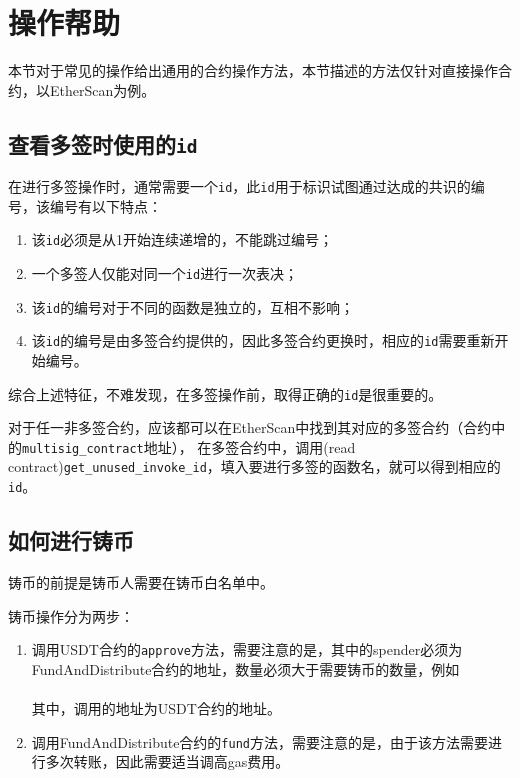 \section{操作帮助}
本节对于常见的操作给出通用的合约操作方法，本节描述的方法仅针对直接操作合约，以EtherScan为例。
\subsection{查看多签时使用的\texttt{id}}
在进行多签操作时，通常需要一个\texttt{id}，此\texttt{id}用于标识试图通过达成的共识的编号，该编号有以下特点：
\begin{enumerate}
\item 该\texttt{id}必须是从1开始连续递增的，不能跳过编号；
\item 一个多签人仅能对同一个\texttt{id}进行一次表决；
\item 该\texttt{id}的编号对于不同的函数是独立的，互相不影响；
\item 该\texttt{id}的编号是由多签合约提供的，因此多签合约更换时，相应的\texttt{id}需要重新开始编号。
\end{enumerate}
综合上述特征，不难发现，在多签操作前，取得正确的\texttt{id}是很重要的。

对于任一非多签合约，应该都可以在EtherScan中找到其对应的多签合约（合约中的\texttt{multisig\_contract}地址），
在多签合约中，调用(read contract)\texttt{get\_unused\_invoke\_id}，填入要进行多签的函数名，就可以得到相应的\texttt{id}。

\subsection{如何进行铸币}
铸币的前提是铸币人需要在铸币白名单中。

铸币操作分为两步：
\begin{enumerate}
\item 调用USDT合约的\texttt{approve}方法，需要注意的是，其中的spender必须为FundAndDistribute合约的地址，数量必须大于需要铸币的数量，例如\\
 \\
其中，调用的地址为USDT合约的地址。

\item 调用FundAndDistribute合约的\texttt{fund}方法，需要注意的是，由于该方法需要进行多次转账，因此需要适当调高gas费用。
\end{enumerate}
